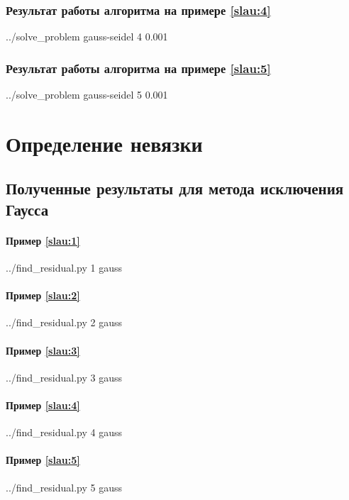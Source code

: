 \documentclass[a4paper]{article}
\begin{document}
\subsubsection{Результат работы алгоритма на примере \eqref{slau:4}}
\bash[stdout]
../solve_problem gauss-seidel 4 0.001
\END

\subsubsection{Результат работы алгоритма на примере \eqref{slau:5}}
\bash[stdout]
../solve_problem gauss-seidel 5 0.001
\END

\break

\section{Определение невязки}


\subsection{Полученные результаты для метода исключения Гаусса}

\paragraph{Пример \eqref{slau:1}}
\bash[stdout]
../find_residual.py 1 gauss
\END

\paragraph{Пример \eqref{slau:2}}
\bash[stdout]
../find_residual.py 2 gauss
\END

\paragraph{Пример \eqref{slau:3}}
\bash[stdout]
../find_residual.py 3 gauss
\END

\paragraph{Пример \eqref{slau:4}}
\bash[stdout]
../find_residual.py 4 gauss
\END

\paragraph{Пример \eqref{slau:5}}
\bash[stdout]
../find_residual.py 5 gauss
\END
\end{document}
